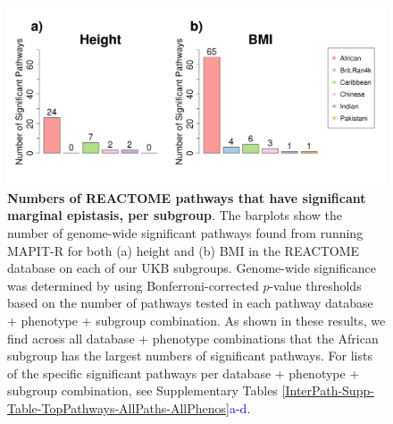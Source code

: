 \documentclass[12pt,a4paper]{article}
\begin{document}
\begin{figure}[htbp]
\centering
\hspace*{-.9cm}
\includegraphics[scale=.45]{Images/Supp/InterPath_Supp_Figure_Barplots_REACTOME_vs4.png}
\caption[TBD]{\textbf{Numbers of REACTOME pathways that have significant marginal epistasis, per subgroup}. The barplots show the number of genome-wide significant pathways found from running MAPIT-R for both (a) height and (b) BMI in the REACTOME database on each of our UKB subgroups. Genome-wide significance was determined by using Bonferroni-corrected $p$-value thresholds based on the number of pathways tested in each pathway database + phenotype + subgroup combination. As shown in these results, we find across all database + phenotype combinations that the African subgroup has the largest numbers of significant pathways. For lists of the specific significant pathways per database + phenotype + subgroup combination, see Supplementary Tables \ref{InterPath-Supp-Table-TopPathways-AllPaths-AllPhenos}\textcolor{blue}{a-d}.}
\label{InterPath-Supp-Figure-Barplots-REACTOME}
\end{figure}
\clearpage
\end{document}
